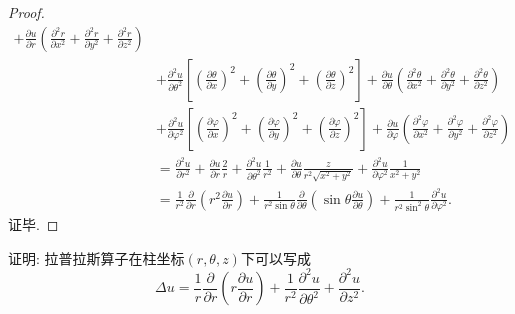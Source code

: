 \begin{proof}
\[\begin{split}
        + \frac{\partial u}{\partial r}\left(\frac{\partial^2r}{\partial x^2}
        + \frac{\partial^2r}{\partial y^2}
        + \frac{\partial^2r}{\partial z^2}\right) \\
    & + \frac{\partial^2u}{\partial\theta^2}
        \left[\left(\frac{\partial\theta}{\partial x}\right)^2
        + \left(\frac{\partial\theta}{\partial y}\right)^2
        + \left(\frac{\partial\theta}{\partial z}\right)^2\right]
        + \frac{\partial u}{\partial\theta}\left(\frac{\partial^2\theta}{\partial x^2}
        + \frac{\partial^2\theta}{\partial y^2}+\frac{\partial^2\theta}{\partial z^2}\right) \\
    & + \frac{\partial^2u}{\partial\varphi^2}
        \left[\left(\frac{\partial\varphi}{\partial x}\right)^2
        + \left(\frac{\partial\varphi}{\partial y}\right)^2
        + \left(\frac{\partial\varphi}{\partial z}\right)^2\right]
        + \frac{\partial u}{\partial\varphi}\left(\frac{\partial^2\varphi}{\partial x^2}
        + \frac{\partial^2\varphi}{\partial y^2}
        + \frac{\partial^2\varphi}{\partial z^2}\right) \\
    & = \frac{\partial^2u}{\partial r^2}+\frac{\partial u}{\partial r}\frac{2}{r}
        + \frac{\partial^2u}{\partial\theta^2}\frac{1}{r^2}
        + \frac{\partial u}{\partial\theta}\frac{z}{r^2\sqrt{x^2+y^2}}
        + \frac{\partial^2u}{\partial\varphi^2}\frac{1}{x^2+y^2} \\
    & = \frac{1}{r^2}\frac{\partial}{\partial r}\left(r^2\frac{\partial u}{\partial r}\right)
        + \frac{1}{r^2\sin\theta}\frac{\partial}{\partial\theta}
        \left(\sin\theta\frac{\partial u}{\partial\theta}\right)
        + \frac{1}{r^2\sin^2\theta}\frac{\partial^2u}{\partial\varphi^2}.
  \end{split}\]
  证毕.
\end{proof}



\begin{exercise}
  证明: 拉普拉斯算子在柱坐标$(r,\theta,z)$下可以写成
  \[\Delta u
    = \frac{1}{r}\frac{\partial}{\partial r}\left(r\frac{\partial u}{\partial r}\right)
    + \frac{1}{r^2}\frac{\partial^2u}{\partial\theta^2}+\frac{\partial^2u}{\partial z^2}.\]
\end{exercise}

